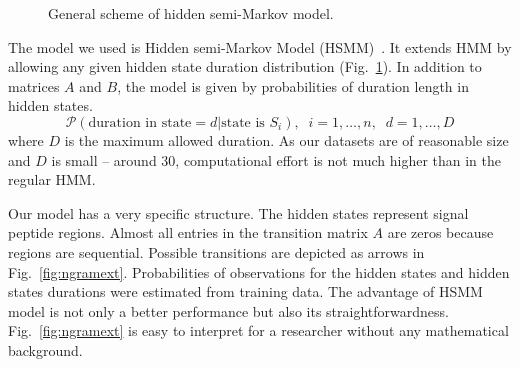 \documentclass[10pt,letterpaper]{article}
\begin{document}
\begin{figure}[h]
\caption{General scheme of hidden semi-Markov model.}
\label{fig:hsmm}
\end{figure}


The model we used is Hidden semi-Markov Model (HSMM)~\cite{Yu2010215}. It extends HMM by allowing any given hidden state duration distribution (Fig.~\ref{fig:hsmm}).
In addition to matrices $A$ and $B$, the model is given by probabilities of duration length in hidden states.
$$\mathcal{P}(\text{duration in state} = d | \text{state is } S_i), \;\; i = 1, \dots, n, \;\; d = 1, \dots, D$$
where $D$ is the maximum allowed duration.
As our datasets are of reasonable size and $D$ is small -- around 30, computational effort is not much 
higher than in the regular HMM. 

Our model has a very specific structure. The hidden states represent signal peptide regions.
Almost all entries in the transition matrix $A$ are zeros because regions are sequential.
Possible transitions are depicted as arrows in Fig.~\ref{fig:ngramext}.
Probabilities of observations for the hidden states and hidden states durations were estimated from training data.
The advantage of HSMM model is not only a better performance but also its straightforwardness.
Fig.~\ref{fig:ngramext} is easy to interpret for a researcher without any mathematical background.
\end{document}
